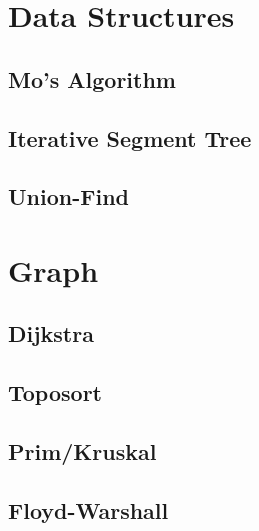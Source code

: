 \section{Data Structures}
\subsection{Mo's Algorithm}
\raggedbottom
\vspace{-.7\baselineskip}\hrulefill
\vspace{0.1\baselineskip}\subsection{Iterative Segment Tree}
\raggedbottom
\vspace{-.7\baselineskip}\hrulefill
\vspace{0.1\baselineskip}\subsection{Union-Find}
\raggedbottom
\vspace{-.7\baselineskip}\hrulefill
\vspace{0.1\baselineskip}
\section{Graph}
\subsection{Dijkstra}
\raggedbottom
\vspace{-.7\baselineskip}\hrulefill
\vspace{0.1\baselineskip}\subsection{Toposort}
\raggedbottom
\vspace{-.7\baselineskip}\hrulefill
\vspace{0.1\baselineskip}\subsection{Prim/Kruskal}
\raggedbottom
\vspace{-.7\baselineskip}\hrulefill
\vspace{0.1\baselineskip}\subsection{Floyd-Warshall}
\raggedbottom
\vspace{-.7\baselineskip}\hrulefill
\vspace{0.1\baselineskip}
